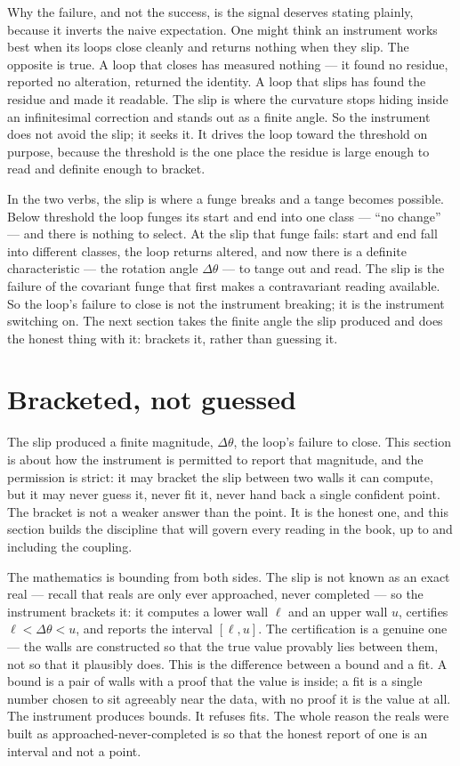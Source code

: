 Why the failure, and not the success, is the signal deserves stating plainly, because it inverts the naive expectation. One
might think an instrument works best when its loops close cleanly and returns nothing when they slip. The opposite is true. A
loop that closes has measured nothing --- it found no residue, reported no alteration, returned the identity. A loop that
slips has found the residue and made it readable. The slip is where the curvature stops hiding inside an infinitesimal
correction and stands out as a finite angle. So the instrument does not avoid the slip; it seeks it. It drives the loop
toward the threshold on purpose, because the threshold is the one place the residue is large enough to read and definite
enough to bracket.

In the two verbs, the slip is where a funge breaks and a tange becomes possible. Below threshold the loop funges its start
and end into one class --- ``no change'' --- and there is nothing to select. At the slip that funge fails: start and end fall
into different classes, the loop returns altered, and now there is a definite characteristic --- the rotation angle
$\Delta\theta$ --- to tange out and read. The slip is the failure of the covariant funge that first makes a contravariant
reading available. So the loop's failure to close is not the instrument breaking; it is the instrument switching on. The next
section takes the finite angle the slip produced and does the honest thing with it: brackets it, rather than guessing it.

\section{Bracketed, not guessed}

The slip produced a finite magnitude, $\Delta\theta$, the loop's failure to close. This section is about how the instrument
is permitted to report that magnitude, and the permission is strict: it may bracket the slip between two walls it can
compute, but it may never guess it, never fit it, never hand back a single confident point. The bracket is not a weaker
answer than the point. It is the honest one, and this section builds the discipline that will govern every reading in the
book, up to and including the coupling.

The mathematics is bounding from both sides. The slip is not known as an exact real --- recall that reals are only ever
approached, never completed --- so the instrument brackets it: it computes a lower wall $\ell$ and an upper wall $u$,
certifies $\ell < \Delta\theta < u$, and reports the interval $[\ell, u]$. The certification is a genuine one --- the walls
are constructed so that the true value provably lies between them, not so that it plausibly does. This is the difference
between a bound and a fit. A bound is a pair of walls with a proof that the value is inside; a fit is a single number chosen
to sit agreeably near the data, with no proof it is the value at all. The instrument produces bounds. It refuses fits. The
whole reason the reals were built as approached-never-completed is so that the honest report of one is an interval and not a
point.

